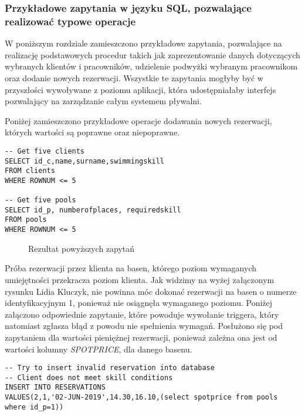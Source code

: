 \documentclass[a4paper]{article}
\newcounter{subsubsubsection}[subsubsection]
\begin{document}
\newpage

\subsubsection{Przykładowe zapytania w języku SQL, pozwalające realizować typowe operacje}

W poniższym rozdziale zamieszczono przykładowe zapytania, pozwalające na realizację podstawowych procedur takich jak zaprezentowanie danych dotyczących wybranych klientów i pracowników, udzielenie podwyżki wybranym pracownikom oraz dodanie nowych rezerwacji. Wszystkie te zapytania mogłyby być w przyszłości wywoływane z poziomu aplikacji, która udostępniałaby interfejs pozwalający na zarządzanie całym systemem pływalni.


Poniżej zamieszczono przykładowe operacje dodawania nowych rezerwacji, których wartości są poprawne oraz niepoprawne.

\begin{verbatim}
-- Get five clients
SELECT id_c,name,surname,swimmingskill 
FROM clients 
WHERE ROWNUM <= 5

-- Get five pools
SELECT id_p, numberofplaces, requiredskill
FROM pools
WHERE ROWNUM <= 5 
\end{verbatim}

\begin{figure}[h!]
\centering
{}
\qquad
{}
\caption{Rezultat powyższych zapytań}
\end{figure}

\noindent
Próba rezerwacji przez klienta na basen, którego poziom wymaganych umiejętności przekracza poziom klienta. Jak widzimy na wyżej załączonym rysunku Lidia Kluczyk, nie powinna móc dokonać rezerwacji na basen o numerze identyfikacyjnym 1, ponieważ nie osiągnęła wymaganego poziomu. Poniżej załączono odpowiednie zapytanie, które powoduje wywołanie triggera, który natomiast zgłasza błąd z powodu nie spełnienia wymagań. Posłużono się pod zapytaniem dla wartości pieniężnej rezerwacji, ponieważ zależna ona jest od wartości kolumny \textit{SPOTPRICE}, dla danego basenu.

\begin{verbatim}
-- Try to insert invalid reservation into database
-- Client does not meet skill conditions
INSERT INTO RESERVATIONS
VALUES(2,1,'02-JUN-2019',14.30,16.10,(select spotprice from pools where id_p=1))
\end{verbatim}
\end{document}
